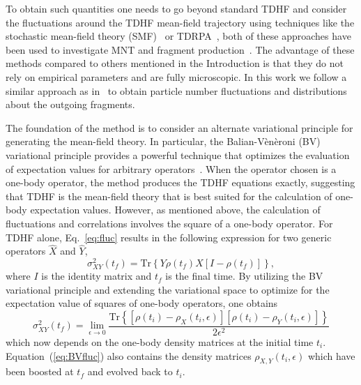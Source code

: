 \documentclass[reprint,aps,prc,twocolumn,superscriptaddress,floatfix,10pt]{revtex4-2}
\begin{document}
To obtain such quantities one needs to go beyond standard TDHF and consider the fluctuations around the TDHF mean-field trajectory using techniques like the stochastic mean-field theory (SMF)~\cite{ayik2008,lacroix2014} or TDRPA~\cite{balian1984}, both of these approaches have been used to investigate MNT and fragment production~\cite{ayik2016,ayik2017,ayik2018,ayik2019,ayik2019b,marston1985,bonche1985,broomfield2008,broomfield2009,simenel2011,williams2018}.
The advantage of these methods compared to others mentioned in the Introduction is that they do not rely on 
empirical parameters and are fully microscopic.
In this work we follow a similar approach as in~\cite{simenel2011,williams2018} to obtain particle number fluctuations and distributions about the outgoing fragments.

The foundation of the method is to consider an alternate variational principle for generating the mean-field theory.
In particular, the Balian-V\`en\`eroni (BV) variational principle provides a powerful technique that optimizes the evaluation of expectation values for arbitrary operators~\cite{balian1984,bonche1985}.
When the operator chosen is a one-body operator, the method produces the TDHF equations exactly, suggesting that TDHF is the mean-field theory that is best suited for the calculation of one-body expectation values.
However, as mentioned above, the calculation of fluctuations and correlations involves the square of a one-body operator.
For TDHF alone, Eq.~\ref{eq:fluc} results in the following expression for two generic operators $\hat{X}$ and $\hat{Y}$,
\begin{equation}
	\sigma_{XY}^2(t_f)=\mathrm{Tr}\left\{Y\rho(t_f)X[I-\rho(t_f)] \right\},
\end{equation}
where $I$ is the identity matrix and $t_f$ is the final time.
By utilizing the BV variational principle and extending the variational space to optimize for the expectation value of squares of one-body operators, one obtains
\begin{equation}
	\sigma_{XY}^2(t_f)=\lim_{\epsilon\rightarrow0}\frac{\mathrm{Tr}\left\{[\rho(t_i)-\rho_X(t_i,\epsilon)][\rho(t_i)-\rho_Y(t_i,\epsilon)]\right\}}{2\epsilon^2}
	\label{eq:BVfluc}
\end{equation}
which now depends on the one-body density matrices at the initial time $t_i$.
Equation~(\ref{eq:BVfluc}) also contains the density matrices $\rho_{X,Y}(t_i,\epsilon)$ which have been boosted at $t_f$ and evolved back to $t_i$.
\end{document}
